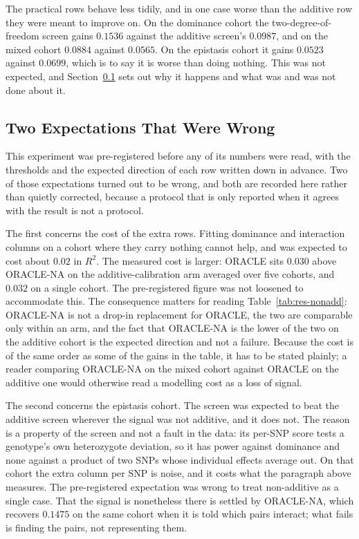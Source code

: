 The practical rows behave less tidily, and in one case worse than the additive row they were meant to improve on. On the dominance cohort the two-degree-of-freedom screen gains $0.1536$ against the additive screen's $0.0987$, and on the mixed cohort $0.0884$ against $0.0565$. On the epistasis cohort it gains $0.0523$ against $0.0699$, which is to say it is worse than doing nothing. This was not expected, and Section~\ref{sec:res-nonadd-honest} sets out why it happens and what was and was not done about it.

\subsection{Two Expectations That Were Wrong}
\label{sec:res-nonadd-honest}
This experiment was pre-registered before any of its numbers were read, with the thresholds and the expected direction of each row written down in advance. Two of those expectations turned out to be wrong, and both are recorded here rather than quietly corrected, because a protocol that is only reported when it agrees with the result is not a protocol.

The first concerns the cost of the extra rows. Fitting dominance and interaction columns on a cohort where they carry nothing cannot help, and was expected to cost about $0.02$ in $R^2$. The measured cost is larger: ORACLE sits $0.030$ above ORACLE-NA on the additive-calibration arm averaged over five cohorts, and $0.032$ on a single cohort. The pre-registered figure was not loosened to accommodate this. The consequence matters for reading Table~\ref{tab:res-nonadd}: ORACLE-NA is not a drop-in replacement for ORACLE, the two are comparable only within an arm, and the fact that ORACLE-NA is the lower of the two on the additive cohort is the expected direction and not a failure. Because the cost is of the same order as some of the gains in the table, it has to be stated plainly; a reader comparing ORACLE-NA on the mixed cohort against ORACLE on the additive one would otherwise read a modelling cost as a loss of signal.

The second concerns the epistasis cohort. The screen was expected to beat the additive screen wherever the signal was not additive, and it does not. The reason is a property of the screen and not a fault in the data: its per-SNP score tests a genotype's own heterozygote deviation, so it has power against dominance and none against a product of two SNPs whose individual effects average out. On that cohort the extra column per SNP is noise, and it costs what the paragraph above measures. The pre-registered expectation was wrong to treat non-additive as a single case. That the signal is nonetheless there is settled by ORACLE-NA, which recovers $0.1475$ on the same cohort when it is told which pairs interact; what fails is finding the pairs, not representing them.

